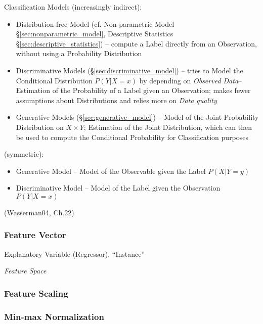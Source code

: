Classification Models (increasingly indirect):
\begin{itemize}
  \item Distribution-free Model (cf. Non-parametric Model
    \S\ref{sec:nonparametric_model}, Descriptive Statistics
    \S\ref{sec:descriptive_statistics}) -- compute a Label directly from an
    Observation, without using a Probability Distribution
  \item Discriminative Models (\S\ref{sec:discriminative_model}) -- tries to
    Model the Conditional Distribution $P(Y|X = x)$ by depending on
    \emph{Observed Data}-- Estimation of the Probability of a Label given an
    Observation; makes fewer assumptions about Distributions and relies
    more on \emph{Data quality}
  \item Generative Models (\S\ref{sec:generative_model}) -- Model of the
    Joint Probability Distribution on $X \times Y$; Estimation of the Joint
    Distribution, which can then be used to compute the Conditional Probability
    for Classification purposes
\end{itemize}

(symmetric):
\begin{itemize}
  \item Generative Model -- Model of the Observable given the Label $P(X|Y = y)$
  \item Discriminative Model -- Model of the Label given the Observation
    $P(Y|X = x)$
\end{itemize}

(Wasserman04, Ch.22)



\subsubsection{Feature Vector}\label{sec:feature_vector}

Explanatory Variable (Regressor), ``Instance''

\emph{Feature Space}



\subsubsection{Feature Scaling}\label{sec:feature_scaling}

\subsubsection{Min-max Normalization}\label{sec:minmax_normalization}

